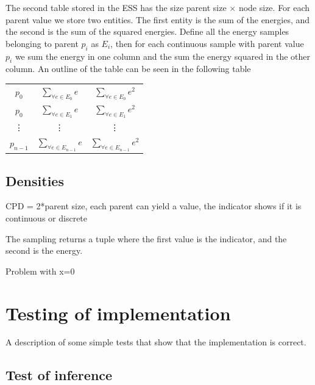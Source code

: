 \documentclass[10pt, conference, compsocconf,a4paper]{IEEEtran}
\begin{document}
The second table stored in the ESS has the size parent size $\times$ node size. For each parent value we store two entities. The first entity is the sum of the energies, and the second is the sum of the squared energies. Define all the energy samples belonging to parent $p_i$ as $E_i$, then for each continuous sample with parent value $p_i$ we sum the energy in one column and the sum the energy squared in the other column. An outline of the table can be seen in the following table
\begin{center}
  \begin{tabular}{c | c | c}
  $p_0$ & $\sum_{\forall e \in E_0} e$ & $\sum_{\forall e \in E_0} e^2$ \\
  $p_0$ & $\sum_{\forall e \in E_1} e$ & $\sum_{\forall e \in E_1} e^2$ \\
  \vdots & \vdots & \vdots \\
  $p_{n-1}$ & $\sum_{\forall e \in E_{n-1}} e$ & $\sum_{\forall e \in E_{n-1}} e^2$ \\
  \end{tabular}  
\end{center}



\subsection{Densities} %
\label{sub:densities}
CPD = 2*parent size, each parent can yield a value, the indicator shows if it is continuous or discrete

The sampling returns a tuple where the first value is the indicator, and the second is the energy.

Problem with x=0


\section{Testing of implementation} %
\label{sec:testing_of_implementation}

A description of some simple tests that show that the implementation is correct. 

\subsection{Test of inference} %
\label{sub:test_of_inference}

\end{document}
